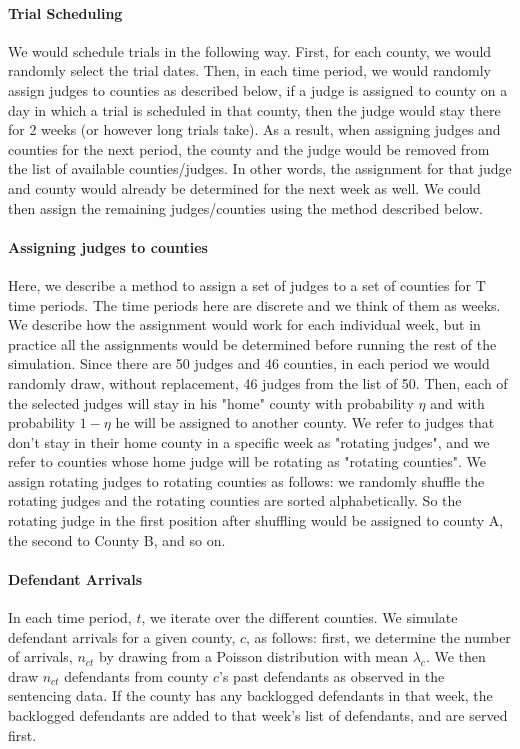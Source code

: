 \documentclass[11pt]{article}
\theoremstyle{ModifiedStyle}
\theoremstyle{ModifiedStyle}
\begin{document}
  \paragraph{Trial Scheduling} We would schedule trials in the following way. First, for each county, we would randomly select the trial dates. Then, in each time period, we would randomly assign judges to counties as described below, if a judge is assigned to county on a day in which a trial is scheduled in that county, then the judge would stay there for 2 weeks (or however long trials take). As a result, when assigning judges and counties for the next period, the county and the judge would be removed from the list of available counties/judges. In other words, the assignment for that judge and county would already be determined for the next week as well. We could then assign the remaining judges/counties using the method described below.

  \paragraph{Assigning judges to counties} Here, we describe a method to assign a set of judges to a set of counties for T time periods. The time periods here are discrete and we think of them as weeks. We describe how the assignment would work for each individual week, but in practice all the assignments would be determined before running the rest of the simulation. Since there are 50 judges and 46 counties, in each period we would randomly draw, without replacement, 46 judges from the list of 50. Then, each of the selected judges will stay in his "home" county with probability $\eta$ and with probability $1-\eta$ he will be assigned to another county. We refer to judges that don't stay in their home county in a specific week as "rotating judges", and we refer to counties whose home judge will be rotating as "rotating counties". We assign rotating judges to rotating counties as follows: we randomly shuffle the rotating judges and the rotating counties are sorted alphabetically. So the rotating judge in the first position after shuffling would be assigned to county A, the second to County B, and so on.

  \paragraph{Defendant Arrivals} In each time period, $t$, we iterate over the different counties. We simulate defendant arrivals for a given county, $c$, as follows: first, we determine the number of arrivals, $n_{ct}$ by drawing from a Poisson distribution with mean $\lambda_c$. We then draw $n_{ct}$ defendants from county $c$'s past defendants as observed in the sentencing data. If the county has any backlogged defendants in that week, the backlogged defendants are added to that week's list of defendants, and are served first.
\end{document}
